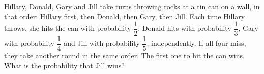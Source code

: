 Hillary, Donald, Gary and Jill take turns throwing rocks at a tin can on a wall, in that order: Hillary first, then Donald, then Gary, then Jill. Each time Hillary throws, she hits the can with probability $\dfrac{1}{2}$; Donald hits with probability $\dfrac{1}{3}$, Gary with probability $\dfrac{1}{4}$ and Jill with probability $\dfrac{1}{5}$, independently. If all four miss, they take another round in the same order. The first one to hit the can wins. What is the probability that Jill wins?
